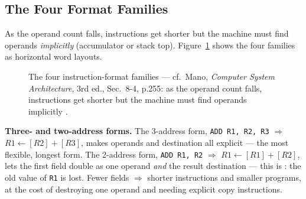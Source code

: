 \documentclass[11pt]{article}
\begin{document}
\subsection{The Four Format Families}

As the operand count falls, instructions get shorter but the machine must find operands \emph{implicitly} (accumulator or stack top). Figure~\ref{fig:format-families} shows the four families as horizontal word layouts.

\begin{figure}[h]
  \centering
  \caption{The four instruction-format families --- cf.\ Mano, \textit{Computer System Architecture}, 3rd ed., Sec.~8-4, p.255: as the operand count falls, instructions get shorter but the machine must find operands implicitly \cite{Mano1993_computer_system_architecture}.}
  \label{fig:format-families}
\end{figure}

\textbf{Three- and two-address forms.} The 3-address form, \texttt{ADD R1, R2, R3} $\Rightarrow$ $R1 \gets [R2]+[R3]$, makes operands and destination all explicit --- the most flexible, longest form. The 2-address form, \texttt{ADD R1, R2} $\Rightarrow$ $R1 \gets [R1]+[R2]$, lets the first field double as one operand \emph{and} the result destination --- this is : the old value of \texttt{R1} is lost. Fewer fields $\Rightarrow$ shorter instructions and smaller programs, at the cost of destroying one operand and needing explicit copy instructions.
\end{document}
